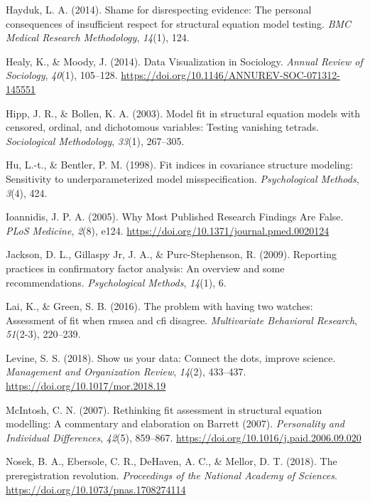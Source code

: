 \documentclass[
  english,
  doc]{apa6}
\newlength{\cslhangindent}
\newenvironment{cslreferences}%
  {\setlength{\parindent}{0pt}%
  \everypar{\setlength{\hangindent}{\cslhangindent}}\ignorespaces}%
  {\par}
\begin{document}
\begin{cslreferences}
\leavevmode\hypertarget{ref-hayduk2014shame}{}%
Hayduk, L. A. (2014). Shame for disrespecting evidence: The personal consequences of insufficient respect for structural equation model testing. \emph{BMC Medical Research Methodology}, \emph{14}(1), 124.

\leavevmode\hypertarget{ref-Healy2014a}{}%
Healy, K., \& Moody, J. (2014). Data Visualization in Sociology. \emph{Annual Review of Sociology}, \emph{40}(1), 105--128. \url{https://doi.org/10.1146/ANNUREV-SOC-071312-145551}

\leavevmode\hypertarget{ref-hipp2003model}{}%
Hipp, J. R., \& Bollen, K. A. (2003). Model fit in structural equation models with censored, ordinal, and dichotomous variables: Testing vanishing tetrads. \emph{Sociological Methodology}, \emph{33}(1), 267--305.

\leavevmode\hypertarget{ref-hu1998fit}{}%
Hu, L.-t., \& Bentler, P. M. (1998). Fit indices in covariance structure modeling: Sensitivity to underparameterized model misspecification. \emph{Psychological Methods}, \emph{3}(4), 424.

\leavevmode\hypertarget{ref-Ioannidis2005}{}%
Ioannidis, J. P. A. (2005). Why Most Published Research Findings Are False. \emph{PLoS Medicine}, \emph{2}(8), e124. \url{https://doi.org/10.1371/journal.pmed.0020124}

\leavevmode\hypertarget{ref-jackson2009reporting}{}%
Jackson, D. L., Gillaspy Jr, J. A., \& Purc-Stephenson, R. (2009). Reporting practices in confirmatory factor analysis: An overview and some recommendations. \emph{Psychological Methods}, \emph{14}(1), 6.

\leavevmode\hypertarget{ref-lai2016problem}{}%
Lai, K., \& Green, S. B. (2016). The problem with having two watches: Assessment of fit when rmsea and cfi disagree. \emph{Multivariate Behavioral Research}, \emph{51}(2-3), 220--239.

\leavevmode\hypertarget{ref-Levine2018}{}%
Levine, S. S. (2018). Show us your data: Connect the dots, improve science. \emph{Management and Organization Review}, \emph{14}(2), 433--437. \url{https://doi.org/10.1017/mor.2018.19}

\leavevmode\hypertarget{ref-McIntosh2007}{}%
McIntosh, C. N. (2007). Rethinking fit assessment in structural equation modelling: A commentary and elaboration on Barrett (2007). \emph{Personality and Individual Differences}, \emph{42}(5), 859--867. \url{https://doi.org/10.1016/j.paid.2006.09.020}

\leavevmode\hypertarget{ref-Nosek2018}{}%
Nosek, B. A., Ebersole, C. R., DeHaven, A. C., \& Mellor, D. T. (2018). The preregistration revolution. \emph{Proceedings of the National Academy of Sciences}. \url{https://doi.org/10.1073/pnas.1708274114}


\end{cslreferences}
\end{document}

